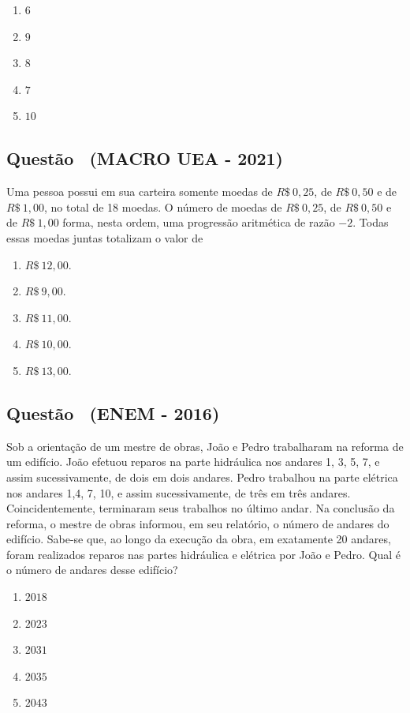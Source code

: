 \documentclass[12pt]{article}
\newcounter{questao}
\newcommand{\novaquestao}[1]{%
  \stepcounter{questao}%
  \subsection*{Questão \thequestao\ (#1)}%
}
\begin{document}
\begin{multicols}{2}
        
            \begin{enumerate}[label=(\alph*), noitemsep]
                \item $6$
                \item $9$
                \item $8$
                \item $7$
                \item $10$
            \end{enumerate}
        
        \novaquestao{MACRO UEA - 2021}
            Uma pessoa possui em sua carteira somente moedas de $R\$\ 0,25$, de $R\$\ 0,50$ e de $R\$\ 1,00$, no total de 18 moedas. O número de moedas de $R\$\ 0,25$, de $R\$\ 0,50$ e de $R\$\ 1,00$ forma, nesta ordem, uma progressão aritmética de razão $-2$. Todas essas moedas juntas totalizam o valor de
            
            \begin{enumerate}[label=(\alph*), noitemsep]
                \item $R\$ \ 12,00.$
                \item $R\$ \ 9,00.$
                \item $R\$ \ 11,00.$
                \item $R\$ \ 10,00.$
                \item $R\$ \ 13,00.$
            \end{enumerate}
        
        \novaquestao{ENEM - 2016}
        
            Sob a orientação de um mestre de obras, João e Pedro trabalharam na reforma de um edifício. João efetuou reparos na parte hidráulica nos andares 1, 3, 5, 7, e assim sucessivamente, de dois em dois andares. Pedro trabalhou na parte elétrica nos andares 1,4, 7, 10, e assim sucessivamente, de três em três andares. Coincidentemente, terminaram seus trabalhos no último andar. Na conclusão da reforma, o mestre de obras informou, em seu relatório, o número de andares do edifício. Sabe-se que, ao longo da execução da obra, em exatamente 20 andares, foram realizados reparos nas partes hidráulica e elétrica por João e Pedro.  Qual é o número de andares desse edifício?
        
            \begin{enumerate}[label=(\alph*), noitemsep]
                \item $2018$
                \item $2023$
                \item $2031$
                \item $2035$
                \item $2043$
            \end{enumerate}
        

\end{multicols}
\end{document}
